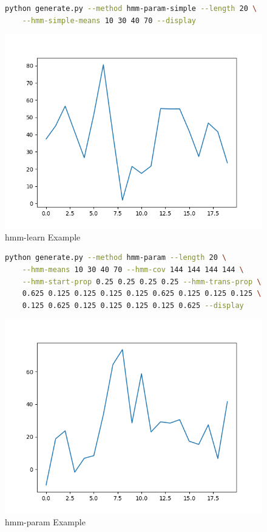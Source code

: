 \begin{figure}
\begin{lstlisting}[language=bash]
    python generate.py --method hmm-param-simple --length 20 \
    --hmm-simple-means 10 30 40 70 --display
\end{lstlisting}
\includegraphics[scale=0.7]{figures/hmm-param-simple}
\caption{hmm-learn Example}    
\label{fig:hmm-param-simple-example}
\end{figure}

\begin{figure}
\begin{lstlisting}[language=bash]
    python generate.py --method hmm-param --length 20 \
    --hmm-means 10 30 40 70 --hmm-cov 144 144 144 144 \
    --hmm-start-prop 0.25 0.25 0.25 0.25 --hmm-trans-prop \
    0.625 0.125 0.125 0.125 0.125 0.625 0.125 0.125 0.125 \
    0.125 0.625 0.125 0.125 0.125 0.125 0.625 --display
\end{lstlisting}
\includegraphics[scale=0.7]{figures/hmm-param}
\caption{hmm-param Example}    
\label{fig:hmm-param-example}
\end{figure}

